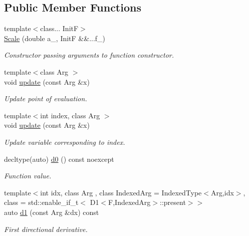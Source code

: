 \subsection*{Public Member Functions}
\begin{DoxyCompactItemize}
\item 
{\footnotesize template$<$class... Init\-F$>$ }\\\hyperlink{structFunG_1_1MathematicalOperations_1_1Scale_a10c61b696b4777db7d5c53b4a96b210a}{Scale} (double a\-\_\-, Init\-F \&\&...f\-\_\-)
\begin{DoxyCompactList}\small\item\em Constructor passing arguments to function constructor. \end{DoxyCompactList}\item 
{\footnotesize template$<$class Arg $>$ }\\void \hyperlink{structFunG_1_1MathematicalOperations_1_1Scale_a78bbb512333a17c72928d3f21de63dee}{update} (const Arg \&x)
\begin{DoxyCompactList}\small\item\em Update point of evaluation. \end{DoxyCompactList}\item 
{\footnotesize template$<$int index, class Arg $>$ }\\void \hyperlink{structFunG_1_1MathematicalOperations_1_1Scale_a49b277539bf6582956f68d325ce4a44d}{update} (const Arg \&x)
\begin{DoxyCompactList}\small\item\em Update variable corresponding to index. \end{DoxyCompactList}\item 
decltype(auto) \hyperlink{structFunG_1_1MathematicalOperations_1_1Scale_aec01731655fabb0f6fcfd06493aec4af}{d0} () const noexcept
\begin{DoxyCompactList}\small\item\em Function value. \end{DoxyCompactList}\item 
{\footnotesize template$<$int idx, class Arg , class Indexed\-Arg  = Indexed\-Type$<$\-Arg,idx$>$, class  = std\-::enable\-\_\-if\-\_\-t$<$ D1$<$\-F,\-Indexed\-Arg$>$\-::present$>$$>$ }\\auto \hyperlink{structFunG_1_1MathematicalOperations_1_1Scale_aa917dfae80d3682fdbbe1e1c8214c503}{d1} (const Arg \&dx) const 
\begin{DoxyCompactList}\small\item\em First directional derivative. \end{DoxyCompactList}\item 

\end{DoxyCompactItemize}
